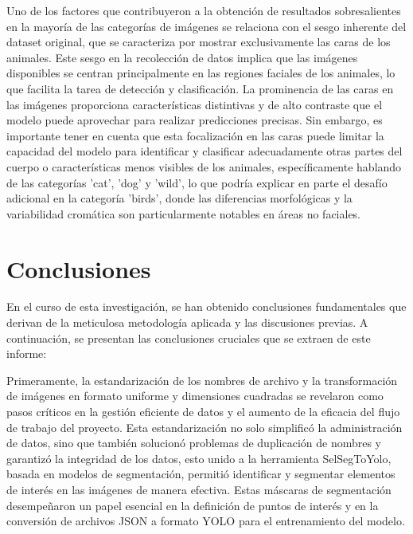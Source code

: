 \documentclass[journal]{IEEEtran}
\begin{document}
Uno de los factores que contribuyeron a la obtención de resultados sobresalientes en la mayoría de las categorías de imágenes se relaciona con el sesgo inherente del dataset original, que se caracteriza por mostrar exclusivamente las caras de los animales. Este sesgo en la recolección de datos implica que las imágenes disponibles se centran principalmente en las regiones faciales de los animales, lo que facilita la tarea de detección y clasificación. La prominencia de las caras en las imágenes proporciona características distintivas y de alto contraste que el modelo puede aprovechar para realizar predicciones precisas. Sin embargo, es importante tener en cuenta que esta focalización en las caras puede limitar la capacidad del modelo para identificar y clasificar adecuadamente otras partes del cuerpo o características menos visibles de los animales, específicamente hablando de las categorías 'cat', 'dog' y 'wild', lo que podría explicar en parte el desafío adicional en la categoría 'birds', donde las diferencias morfológicas y la variabilidad cromática son particularmente notables en áreas no faciales.

\section{Conclusiones}
En el curso de esta investigación, se han obtenido conclusiones fundamentales que derivan de la meticulosa metodología aplicada y las discusiones previas. A continuación, se presentan las conclusiones cruciales que se extraen de este informe:

Primeramente, la estandarización de los nombres de archivo y la transformación de imágenes en formato uniforme y dimensiones cuadradas se revelaron como pasos críticos en la gestión eficiente de datos y el aumento de la eficacia del flujo de trabajo del proyecto. Esta estandarización no solo simplificó la administración de datos, sino que también solucionó problemas de duplicación de nombres y garantizó la integridad de los datos, esto unido a la herramienta SelSegToYolo, basada en modelos de segmentación, permitió identificar y segmentar elementos de interés en las imágenes de manera efectiva. Estas máscaras de segmentación desempeñaron un papel esencial en la definición de puntos de interés y en la conversión de archivos JSON a formato YOLO para el entrenamiento del modelo.
\end{document}
